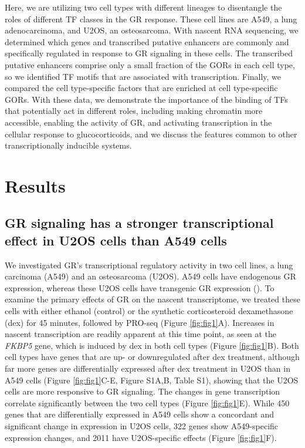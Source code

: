 \documentclass{article}
\begin{document}
{Here, we are utilizing two cell types with different lineages to disentangle the roles of different TF classes in the GR response. These cell lines are A549, a lung adenocarcinoma, and U2OS, an osteosarcoma. With nascent RNA sequencing, we determined which genes and transcribed putative enhancers are commonly and specifically regulated in response to GR signaling in these cells. The transcribed putative enhancers comprise only a small fraction of the GORs in each cell type, so we identified TF motifs that are associated with transcription. Finally, we compared the cell type-specific factors that are enriched at cell type-specific GORs. With these data, we demonstrate the importance of the binding of TFs that potentially act in different roles, including making chromatin more accessible, enabling the activity of GR, and activating transcription in the cellular response to glucocorticoids, and we discuss the features common to other transcriptionally inducible systems. 



\section*{Results}
\label{sec:headings}

\subsection*{GR signaling has a stronger transcriptional effect in U2OS cells than A549 cells}

We investigated GR’s transcriptional regulatory activity in two cell lines, a lung carcinoma (A549) and an osteosarcoma (U2OS).  A549 cells have endogenous GR expression, whereas these U2OS cells have transgenic GR expression (\cite{rogatsky_glucocorticoid_1997}).  To examine the primary effects of GR on the nascent transcriptome, we treated these cells with either ethanol (control) or the synthetic corticosteroid dexamethasone (dex) for 45 minutes, followed by PRO-seq (Figure \ref{fig:fig1}A). Increases in nascent transcription are readily apparent at this time point, as seen at the \emph{FKBP5} gene, which is induced by dex in both cell types (Figure \ref{fig:fig1}B). Both cell types have genes that are up- or downregulated after dex treatment, although far more genes are differentially expressed after dex treatment in U2OS than in A549 cells (Figure \ref{fig:fig1}C-E, Figure S1A,B, Table S1), showing that the U2OS cells are more responsive to GR signaling. The changes in gene transcription correlate significantly between the two cell types (Figure \ref{fig:fig1}E). While 450 genes that are differentially expressed in A549 cells show a concordant and significant change in expression in U2OS cells, 322 genes show A549-specific expression changes, and 2011 have U2OS-specific effects (Figure \ref{fig:fig1}F).

}
\end{document}
